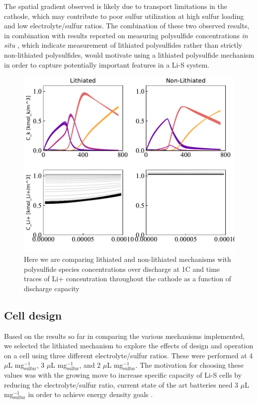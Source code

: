 \documentclass{elsarticle}
\begin{document}
The spatial gradient observed is likely due to transport limitations in the cathode, which may contribute to poor sulfur utilization at high sulfur loading and low electrolyte/sulfur ratios. The combination of these two observed results, in combination with results reported on measuring polysulfide concentrations \textit{in situ} \cite{SAQIB2017266}, which indicate measurement of lithiated polysulfides rather than strictly non-lithiated polysulfides, would motivate using a lithiated polysulfide mechanism in order to capture potentially important features in a Li-S system.


\begin{center}
\begin{figure}[t]
    \centering
    \includegraphics[width=\textwidth]{Figures/Spec_and_li_comp.pdf}
    \caption{Here we are comparing lithiated and non-lithiated mechanisms with polysulfide species concentrations over discharge at 1C and time traces of Li+ concentration throughout the cathode as a function of discharge capacity}
    \label{fig:mechanismcomparisonconc}
\end{figure}
\end{center}

\subsection{Cell design}

Based on the results so far in comparing the various mechanisms implemented, we selected the lithiated mechanism to explore the effects of design and operation on a cell using three different electrolyte/sulfur ratios. These were performed at 4 $\mu$L mg$^{-1}_\mathrm{sulfur}$, 3 $\mu$L mg$^{-1}_\mathrm{sulfur}$, and 2 $\mu$L mg$^{-1}_\mathrm{sulfur}$. The motivation for choosing these values was with the growing move to increase specific capacity of Li-S cells by reducing the electrolyte/sulfur ratio, current state of the art batteries need 3 $\mu$L mg$^{-1}_\mathrm{sulfur}$ in order to achieve energy density goals \cite{Kang2019}. 
\end{document}
